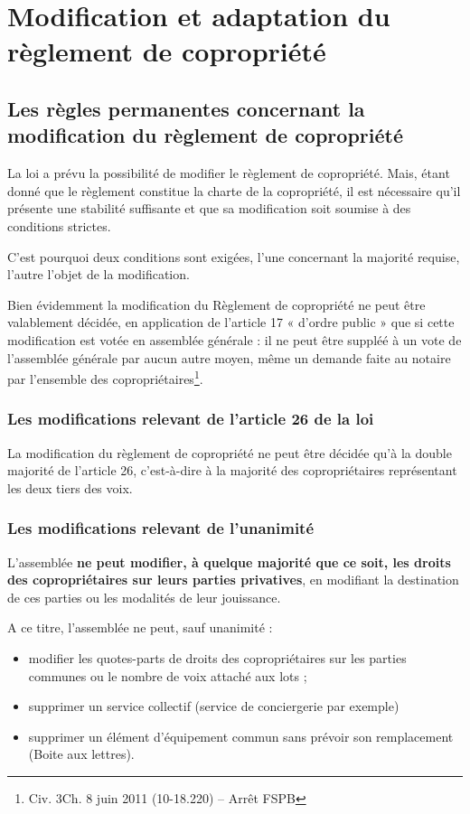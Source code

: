 \section{Modification et adaptation du règlement de copropriété}

	\subsection{Les règles permanentes concernant la modification du règlement de copropriété}
	
		La loi a prévu la possibilité de modifier le règlement de copropriété. Mais, étant donné que le règlement constitue la charte de la copropriété, il est nécessaire qu'il présente une stabilité suffisante et que sa modification soit soumise à des conditions strictes.
		
		C'est pourquoi deux conditions sont exigées, l'une concernant la majorité requise, l'autre l'objet de la modification.
		
		Bien évidemment la modification du Règlement de copropriété ne peut être valablement décidée, en application de l’article 17 « d’ordre public » que si cette modification est votée en assemblée générale : il ne peut être suppléé à un vote de l’assemblée générale par aucun autre moyen, même un demande faite au notaire par l’ensemble des copropriétaires\footnote{Civ. 3\degres Ch. 8 juin 2011 (10-18.220) – Arrêt  FSPB}.
		
		\subsubsection{Les modifications relevant de l’article 26 de la loi}
	
			La modification du règlement de copropriété ne peut être décidée qu'à la double majorité de l'article 26, c'est-à-dire à la majorité des copropriétaires représentant les deux tiers des voix.
		
		\subsubsection{Les modifications relevant de l’unanimité}
			
			L'assemblée \textbf{ne peut modifier, à quelque majorité que ce soit, les droits des copropriétaires sur leurs parties privatives}, en modifiant la destination de ces parties ou les modalités de leur jouissance.
			
			A ce titre, l'assemblée ne peut, sauf unanimité :
			\begin{itemize}
				\item modifier les quotes-parts de droits des copropriétaires sur les parties communes ou le nombre de voix attaché aux lots ;
				\item supprimer un service collectif (service de conciergerie par exemple)
				\item supprimer un élément d'équipement commun sans prévoir son remplacement (Boite aux lettres).
			\end{itemize}


